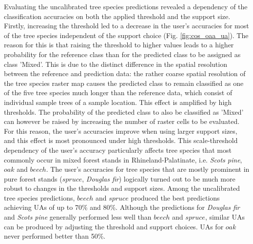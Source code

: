 Evaluating the uncalibrated tree species predictions revealed a dependency of the classification accuracies on both the applied threshold and the support size. Firstly, increasing the threshold led to a decrease in the user's accuracies for most of the tree species independent of the support choice (Fig. \ref{fig:cos_oaa_ua}). The reason for this is that raising the threshold to higher values leads to a higher probability for the reference class than for the predicted class to be assigned as class 'Mixed'. This is due to the distinct difference in the spatial resolution between the reference and prediction data: the rather coarse spatial resolution of the tree species raster map causes the predicted class to remain classified as one of the five tree species much longer than the reference data, which consist of individual sample trees of a sample location. This effect is amplified by high thresholds. The probability of the predicted class to also be classified as 'Mixed' can however be raised by increasing the number of raster cells to be evaluated. For this reason, the user's accuracies improve when using larger support sizes, and this effect is most pronounced under high thresholds. This scale-threshold dependency of the user's accuracy particularly affects tree species that most commonly occur in mixed forest stands in Rhineland-Palatinate, i.e. \textit{Scots pine}, $oak$ and $beech$. The user's accuracies for tree species that are mostly prominent in pure forest stands ($spruce$, \textit{Douglas fir}) logically turned out to be much more robust to changes in the thresholds and support sizes. Among the uncalibrated tree species predictions, $beech$ and $spruce$ produced the best predictions achieving UAs of up to 70\% and 80\%.  Although the predictions for \textit{Douglas fir} and \textit{Scots pine} generally performed less well than $beech$ and $spruce$, similar UAs can be produced by adjusting the threshold and support choices. UAs for $oak$ never performed better than 50\%.

